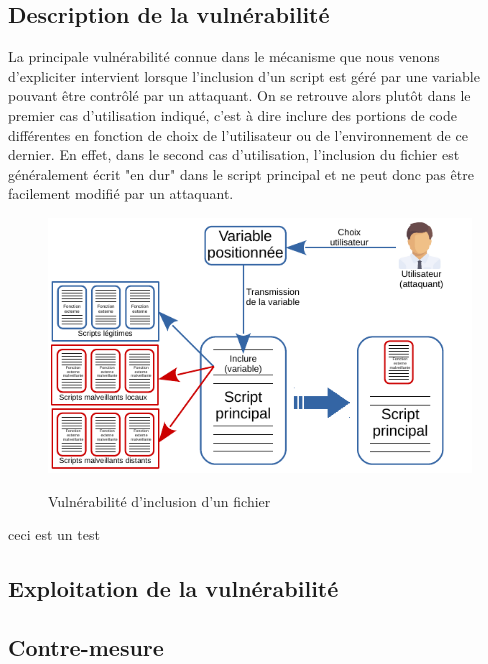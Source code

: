 \subsection{Description de la vulnérabilité}

La principale vulnérabilité connue dans le mécanisme que nous venons d'expliciter intervient lorsque l'inclusion d'un script est géré par une variable pouvant être contrôlé par un attaquant. On se retrouve alors plutôt dans le premier cas d'utilisation indiqué, c'est à dire inclure des portions de code différentes en fonction de choix de l'utilisateur ou de l'environnement de ce dernier. En effet, dans le second cas d'utilisation, l'inclusion du fichier est généralement écrit "en dur" dans le script principal et ne peut donc pas être facilement modifié par un attaquant.

\begin{figure}[!h]
\begin{center}

\label{inclusion}
\includegraphics[scale=1.4]{images/include_hacked.pdf}

\caption{Vulnérabilité d'inclusion d'un fichier}

\end{center}
\end{figure}


ceci est un test

\subsection{Exploitation de la vulnérabilité}

\subsection{Contre-mesure}

